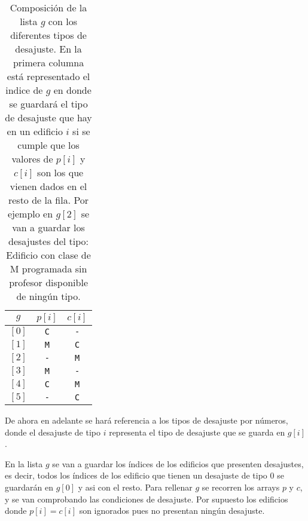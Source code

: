 \documentclass[11pt]{article}
\begin{document}
    \begin{table}[h]
        \centering
        \label{Tabla_de_Desajustes}
        \begin{tabular}{|c|c|c|}
            \hline \textbf{$g$} & \textbf{$p[i]$} & \textbf{$c[i]$}\\ 
            \hline $[0]$ & \texttt{C} & \texttt{-} \\
            \hline $[1]$ & \texttt{M} & \texttt{C} \\
            \hline $[2]$ & \texttt{-} & \texttt{M} \\
            \hline $[3]$ & \texttt{M} & \texttt{-} \\
            \hline $[4]$ & \texttt{C} & \texttt{M} \\
            \hline $[5]$ & \texttt{-} & \texttt{C} \\
            \hline
        \end{tabular}
        \caption{Composición de la lista $g$ con los diferentes tipos de desajuste. En la primera columna está
        representado el indice de $g$ en donde se guardará el tipo de desajuste que hay en un edificio $i$ si se
        cumple que los valores de $p[i]$ y $c[i]$ son los que vienen dados en el resto de la fila. Por ejemplo en
        $g[2]$ se van a guardar los desajustes del tipo: Edificio con clase de M programada sin profesor
        disponible de ningún tipo.}
    \end{table}

    De ahora en adelante se hará referencia a los tipos de desajuste por números, donde el desajuste de tipo $i$
    representa el tipo de desajuste que se guarda en $g[i]$.

    En la lista $g$ se van a guardar los índices de los edificios que presenten desajustes, es decir, todos los
    índices de los edificio que tienen un desajuste de tipo 0 se guardarán en $g[0]$ y asi con el resto. Para
    rellenar $g$ se recorren los arrays $p$ y $c$, y se van comprobando las condiciones de desajuste. Por supuesto
    los edificios donde $p[i] = c[i]$ son ignorados pues no presentan ningún desajuste.
\end{document}

